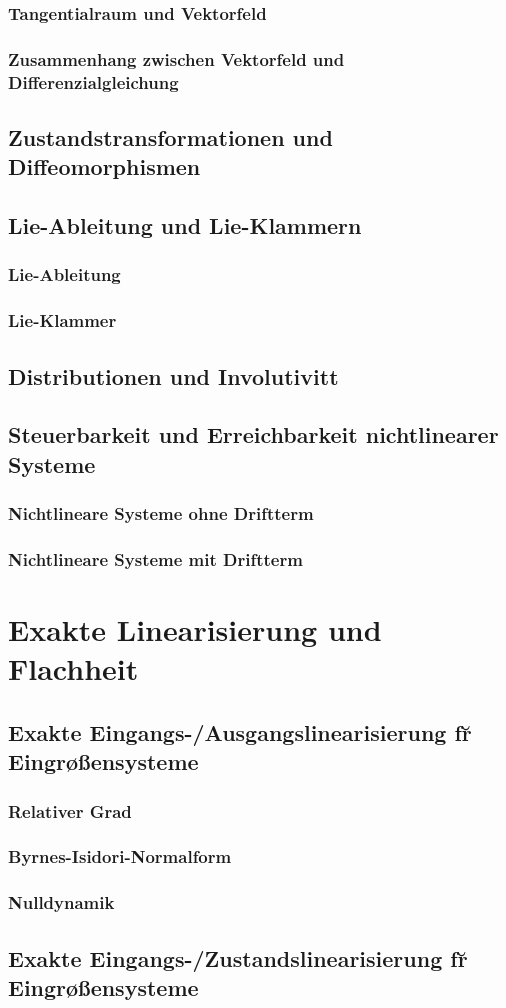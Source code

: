 \subsubsection{Tangentialraum und Vektorfeld}
\subsubsection{Zusammenhang zwischen Vektorfeld und Differenzialgleichung}
\subsection{Zustandstransformationen und Diffeomorphismen}
\subsection{Lie-Ableitung und Lie-Klammern}
\subsubsection{Lie-Ableitung}
\subsubsection{Lie-Klammer}
\subsection{Distributionen und Involutivit\a t}
\subsection{Steuerbarkeit und Erreichbarkeit nichtlinearer Systeme}
\subsubsection{Nichtlineare Systeme ohne Driftterm}
\subsubsection{Nichtlineare Systeme mit Driftterm}

\section{Exakte Linearisierung und Flachheit}
\subsection{Exakte Eingangs-/Ausgangslinearisierung f\u r Eingr\o \ss ensysteme}
\subsubsection{Relativer Grad}
\subsubsection{Byrnes-Isidori-Normalform}
\subsubsection{Nulldynamik}
\subsection{Exakte Eingangs-/Zustandslinearisierung f\u r Eingr\o \ss ensysteme}